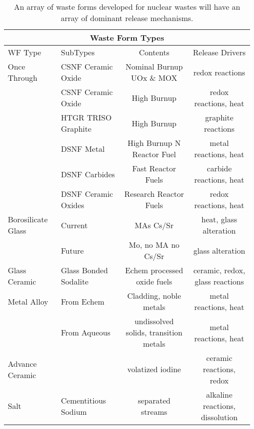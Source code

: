 %
\begin{table}[h!]
  \centering
  \footnotesize{
  \begin{tabular}{|l|l|c|c|}
    \multicolumn{4}{c}{\textbf{Waste Form Types}}\\
    \hline
    WF Type & SubTypes & Contents & Release Drivers  \\
    \hline
    \hline
    Once Through & \gls{CSNF} Ceramic Oxide & Nominal Burnup UOx \& MOX & redox reactions \\
                 & \gls{CSNF} Ceramic Oxide & High Burnup  & redox reactions, heat  \\
                 & \gls{HTGR} TRISO Graphite & High Burnup & graphite reactions\\
                 & \gls{DSNF} Metal  & High Burnup N Reactor Fuel & metal reactions,  heat\\
                 & \gls{DSNF} Carbides  & Fast Reactor Fuels & carbide reactions,  heat\\
                 & \gls{DSNF} Ceramic Oxides  & Research Reactor Fuels & redox reactions,  heat\\
    \hline
    Borosilicate Glass & Current & \glspl{MA} Cs/Sr & heat, glass alteration \\
                       & Future & Mo, no \gls{MA} no Cs/Sr & glass alteration  \\
    \hline
    Glass Ceramic & Glass Bonded Sodalite & Echem processed oxide fuels & ceramic, redox, glass reactions  \\
    \hline
    Metal Alloy & From Echem & Cladding, noble metals & metal reactions, heat \\
                & From Aqueous & undissolved solids, transition metals & metal reactions, heat  \\
    \hline
    Advance Ceramic &  & volatized iodine  & ceramic reactions, redox \\
    \hline
    Salt  & Cementitious Sodium  & separated streams  & alkaline reactions, dissolution \\
    \hline
  \end{tabular}
  \caption[Waste Form Types]{An array of waste forms developed for nuclear 
  wastes will have an array of dominant release 
  mechanisms.\cite{blink_disposal_2010}}
  \label{tab:wf}
  }
\end{table}


